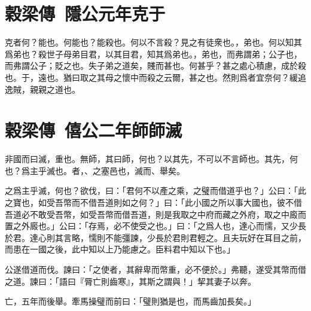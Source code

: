 \section[鄭伯克段于鄢\quad{\small 穀梁傳 隱公元年}]{{\normalsize 穀梁傳\ 隱公元年}\quad {}克于}
克者何？能也。何能也？能殺也。何以不言殺？見之有徒衆也。，弟也。何以知其爲弟也？殺世子母弟目君，以其目君，知其爲弟也。，弟也，而弗謂弟；公子也，而弗謂公子；貶之也。失子弟之道矣，賤而甚也。何甚乎？甚之處心積慮，成於殺也。于，遠也。猶曰取之其母之懷中而殺之云爾，甚之也。然則爲者宜奈何？緩追逸賊，親親之道也。

\section[虞師晉師滅夏陽\quad{\small 穀梁傳 僖公二年}]{{\normalsize 穀梁傳\ 僖公二年}\quad {}師師滅}
非國而曰滅，重也。無師，其曰師，何也？以其先，不可以不言師也。其先，何也？爲主乎滅也。者，、之塞邑也，滅而、舉矣。

之爲主乎滅，何也？欲伐，曰：「君何不以產之乘，之璧而借道乎也？」公曰：「此之寶也，如受吾幣而不借吾道則如之何？」曰：「此小國之所以事大國也，彼不借吾道必不敢受吾幣，如受吾幣而借吾道，則是我取之中府而藏之外府，取之中廄而置之外廄也。」公曰：「存焉，必不使受之也。」曰：「之爲人也，達心而懦，又少長於君。達心則其言略，懦則不能彊諫，少長於君則君輕之。且夫玩好在耳目之前，而患在一國之後，此中知以上乃能慮之。臣料君中知以下也。」

公遂借道而伐。諫曰：「之使者，其辭卑而幣重，必不便於。」弗聽，遂受其幣而借之道。諫曰：「語曰『脣亡則齒寒』，其斯之謂與！」挈其妻子以奔。

亡，五年而後舉。牽馬操璧而前曰：「璧則猶是也，而馬齒加長矣。」
\nopagebreak
\theendnotes

